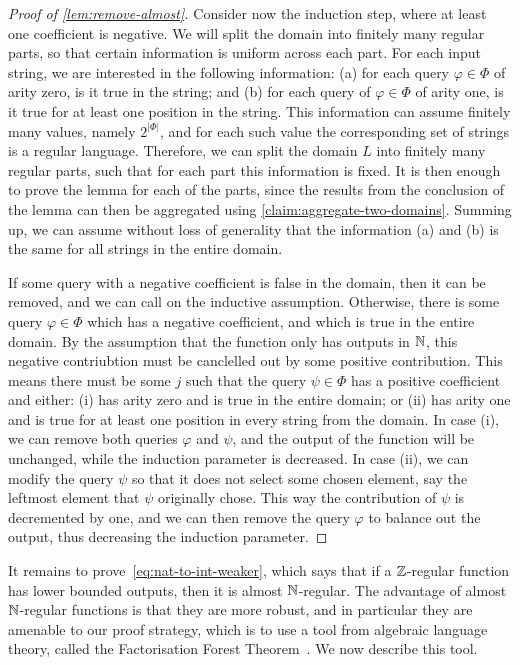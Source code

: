 \begin{proof}[Proof of \cref{lem:remove-almost}]
        Consider now the induction step, where at least one coefficient is negative. We will split the domain into finitely many regular parts, so that certain information is uniform across each part. 
        For each input string, we are interested in the following information: (a) for each query $\varphi \in \Phi$ of arity zero, is it true in the string; and (b) for each query of $\varphi \in \Phi$ of arity one, is it true for at least one position in the string. This information can assume finitely many values, namely $2^{|\Phi|}$, and for each such value the corresponding set of strings is a regular language. Therefore, we can split the domain $L$ into finitely many regular parts, such that for each part this information is fixed. It is then enough to prove the lemma for each of the parts, since the results from the conclusion of the lemma can then be aggregated using  \cref{claim:aggregate-two-domains}. Summing up, we  can assume without loss of generality that the information (a) and (b) is the same for all strings in the entire domain. 
        
        If some query with a negative coefficient is false in the domain, then it can be removed, and we can call on the inductive assumption. Otherwise, there is some query $\varphi \in \Phi$ which has a negative coefficient, and which is true in the entire domain. By the assumption that the function only has outputs in ${\mathbb N}$, this negative contriubtion must be canclelled out by some positive contribution. This means  there must be some $j$ such that the query $\psi \in \Phi$ has a positive coefficient and either: (i) has arity zero and is true in the entire domain; or (ii) has arity one and is true for at least one position in every string from the domain. In case (i), we can remove both queries $\varphi$ and $\psi$, and the output of the function will be unchanged, while the induction parameter is decreased. In case (ii), we can modify the query $\psi$ so that it does not select some chosen element, say the leftmost element that $\psi$ originally chose. This way the contribution of $\psi$ is decremented by one, and we can then remove the query $\varphi$ to balance out the output, thus decreasing the induction parameter.
    \end{proof}

It remains to prove~\eqref{eq:nat-to-int-weaker}, which says that if a ${\mathbb Z}$-regular function has lower bounded outputs, then it is almost ${\mathbb N}$-regular. The advantage of almost ${\mathbb N}$-regular functions is that they are more robust, and in particular they are amenable to our proof strategy, which is to use a tool from algebraic language theory, called the Factorisation Forest Theorem~\cite[Theorem 6.1]{simonFactorizationForestsFinite1990}. We now describe this tool.

